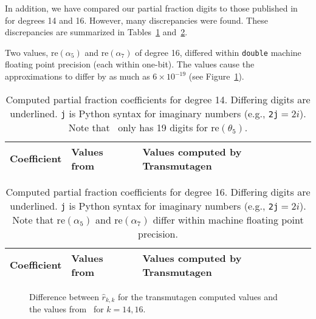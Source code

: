 In addition, we have compared our partial fraction digits to those published
in~\cite{pusa2012correction} for degrees 14 and 16. However, many
discrepancies were found. These discrepancies are summarized in
Tables~\ref{table:pusa-degree-14} and~\ref{table:pusa-degree-16}.

Two values, $\mathrm{re}(\alpha_5)$ and $\mathrm{re}(\alpha_7)$ of degree 16,
differed within \texttt{double} machine floating point precision (each within
one-bit). The values cause the approximations to differ by as much as
$6\times10^{-19}$ (see Figure~\ref{fig:pusa-differences}).

\setul{}{1pt}

\begin{table}[h!]
\centering
\begin{tabular}{ r b{1.8in} b{1.8in} }
Coefficient & Values from~\cite{pusa2012correction} & Values computed by Transmutagen \\
\midrule

\bottomrule
\end{tabular}
\caption{Computed partial fraction coefficients for degree 14. Differing
  digits are underlined. \texttt{j} is Python syntax for imaginary numbers
  (e.g., \texttt{2j}$=2i$). Note that~ only has 19
  digits for $\mathrm{re}(\theta_5)$.}
\label{table:pusa-degree-14}
\end{table}

\begin{table}[h!]
\centering
\begin{tabular}{ r b{1.8in} b{1.8in} }
Coefficient & Values from~\cite{pusa2012correction} & Values computed by Transmutagen \\
\midrule

\bottomrule
\end{tabular}
\caption{Computed partial fraction coefficients for degree 16. Differing
  digits are underlined. \texttt{j} is Python syntax for imaginary numbers
  (e.g., \texttt{2j}$=2i$). Note that $\mathrm{re}(\alpha_5)$ and
  $\mathrm{re}(\alpha_7)$ differ within machine floating point
  precision.}
\label{table:pusa-degree-16}
\end{table}

\begin{figure}[!ht]
\centering
\resizebox{0.9\textwidth}{!}{}
\caption{Difference between $\hat{r}_{k,k}$ for the transmutagen computed
  values and the values from~ for $k=14,16$.}
\label{fig:pusa-differences}
\end{figure}

